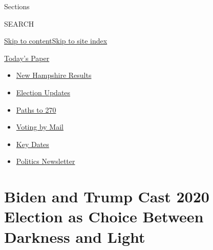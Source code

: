 Sections

SEARCH

\protect\hyperlink{site-content}{Skip to
content}\protect\hyperlink{site-index}{Skip to site index}

\href{https://myaccount.nytimes3xbfgragh.onion/auth/login?response_type=cookie\&client_id=vi}{}

\href{https://www.nytimes3xbfgragh.onion/section/todayspaper}{Today's
Paper}

\begin{itemize}
\item
  \href{https://www.nytimes3xbfgragh.onion/interactive/2020/09/08/us/elections/results-new-hampshire-primary-elections.html?action=click\&pgtype=Article\&state=default\&region=TOP_BANNER\&context=storylines_menu}{New
  Hampshire Results}
\item
  \href{https://www.nytimes3xbfgragh.onion/live/2020/09/08/us/trump-vs-biden?action=click\&pgtype=Article\&state=default\&region=TOP_BANNER\&context=storylines_menu}{Election
  Updates}
\item
  \href{https://www.nytimes3xbfgragh.onion/interactive/2020/us/elections/election-states-biden-trump.html?action=click\&pgtype=Article\&state=default\&region=TOP_BANNER\&context=storylines_menu}{Paths
  to 270}
\item
  \href{https://www.nytimes3xbfgragh.onion/interactive/2020/08/31/us/politics/vote-by-mail-deadlines.html?action=click\&pgtype=Article\&state=default\&region=TOP_BANNER\&context=storylines_menu}{Voting
  by Mail}
\item
  \href{https://www.nytimes3xbfgragh.onion/interactive/2019/us/elections/2020-presidential-election-calendar.html?action=click\&pgtype=Article\&state=default\&region=TOP_BANNER\&context=storylines_menu}{Key
  Dates}
\item
  \href{https://www.nytimes3xbfgragh.onion/newsletters/politics?action=click\&pgtype=Article\&state=default\&region=TOP_BANNER\&context=storylines_menu}{Politics
  Newsletter}
\end{itemize}

\hypertarget{biden-and-trump-cast-2020-election-as-choice-between-darkness-and-light}{%
\section{Biden and Trump Cast 2020 Election as Choice Between Darkness
and
Light}\label{biden-and-trump-cast-2020-election-as-choice-between-darkness-and-light}}

